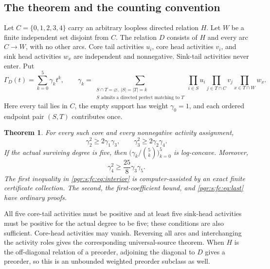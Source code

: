 \documentclass[11pt]{article}
\numberwithin{equation}{section}
\newtheorem{theorem}{Theorem}[section]\newtheorem{lemma}[theorem]{Lemma}\newtheorem{proposition}[theorem]{Proposition}\newtheorem{corollary}[theorem]{Corollary}
\theoremstyle{definition}\newtheorem{definition}[theorem]{Definition}\newtheorem{remark}[theorem]{Remark}
\begin{document}
\subsection{The theorem and the counting convention}
Let $C=\{0,1,2,3,4\}$ carry an arbitrary loopless directed relation $H$. Let $W$ be a finite independent set disjoint from $C$. The relation $D$ consists of $H$ and every arc $C\to W$, with no other arcs. Core tail activities $u_i$, core head activities $v_i$, and sink head activities $w_x$ are independent and nonnegative. Sink-tail activities never enter. Put
\[
 \Gamma_D(t)=\sum_{k=0}^5\gamma_k t^k,\qquad
 \gamma_k=\sum_{\substack{S\cap T=\varnothing,\ |S|=|T|=k\\
 S\text{ admits a directed perfect matching to }T}}
 \prod_{i\in S}u_i\prod_{j\in T\cap C}v_j\prod_{x\in T\cap W}w_x.
\]
Here every tail lies in $C$, the empty support has weight $\gamma_0=1$, and each ordered endpoint pair $(S,T)$ contributes once.

\begin{theorem}\label{pgr:s:fc:thm:main}
For every such core and every nonnegative activity assignment,
\begin{equation}\label{pgr:s:fc:eq:interior}
 \gamma_2^2\ge2\gamma_1\gamma_3,
 \qquad \gamma_3^2\ge2\gamma_2\gamma_4.
\end{equation}
If the actual surviving degree is five, then
$\bigl(\gamma_k/\binom5k\bigr)_{k=0}^5$ is log-concave. Moreover,
\begin{equation}\label{pgr:s:fc:eq:last}
 \gamma_4^2\ge\frac{25}{8}\gamma_3\gamma_5.
\end{equation}
The first inequality in \eqref{pgr:s:fc:eq:interior} is computer-assisted by an exact finite certificate collection. The second, the first-coefficient bound, and \eqref{pgr:s:fc:eq:last} have ordinary proofs.
\end{theorem}

All five core-tail activities must be positive and at least five sink-head activities must be positive for the actual degree to be five; these conditions are also sufficient. Core-head activities may vanish. Reversing all arcs and interchanging the activity roles gives the corresponding universal-source theorem. When $H$ is the off-diagonal relation of a preorder, adjoining the diagonal to $D$ gives a preorder, so this is an unbounded weighted preorder subclass as well.
\end{document}
